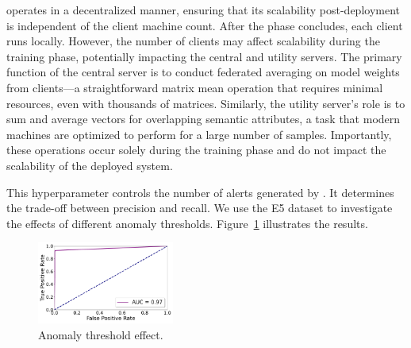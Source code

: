 

 \Sys operates in a decentralized manner, ensuring that its scalability post-deployment is independent of the client machine count. After the \fpgl phase concludes, each client runs \Sys locally. However, the number of clients may affect scalability during the training phase, potentially impacting the central and utility servers. The primary function of the central server is to conduct federated averaging on model weights from clients—a straightforward matrix mean operation that requires minimal resources, even with thousands of matrices. Similarly, the utility server's role is to sum and average vectors for overlapping semantic attributes, a task that modern machines are optimized to perform for a large number of samples. Importantly, these operations occur solely during the training phase and do not impact the scalability of the deployed system.

 This hyperparameter controls the number of alerts generated by \Sys. It determines the trade-off between precision and recall. We use the E5 dataset to investigate the effects of different anomaly thresholds. Figure~\ref{thresh} illustrates the results.

\begin{figure}[!t]
  \centering
  \includegraphics[width=0.4\textwidth]{fig/thresh.pdf}
  \caption{Anomaly threshold effect.}
  \label{thresh}
  \vspace{-2ex}
\end{figure}

